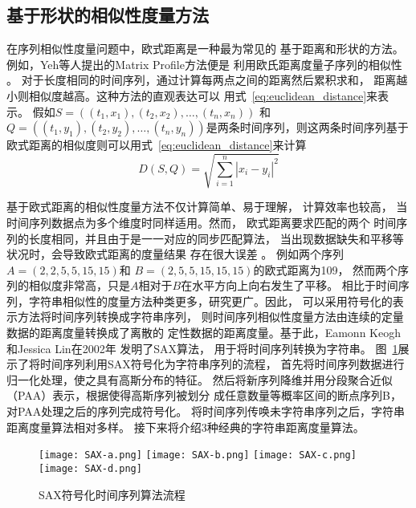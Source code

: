 \subsection{基于形状的相似性度量方法}
在序列相似性度量问题中，欧式距离是一种最为常见的
基于距离和形状的方法。
例如，Yeh等人提出的Matrix Profile方法便是
利用欧氏距离度量子序列的相似性
\cite{DBLP:conf/icdm/YehZUBDDSMK16}。
对于长度相同的时间序列，通过计算每两点之间的距离然后累积求和，
距离越小则相似度越高。这种方法的直观表达可以
用式~\ref{eq:euclidean_distance}来表示。
假如$S=\left(\left(t_1,x_1 \right),\left(t_2,x_2\right),\dots,\left(t_n,x_n\right)\right)$
和$Q=\left(\left(t_1,y_1 \right),\left(t_2,y_2\right),\dots,\left(t_n,y_n\right)\right)$是两条时间序列，则这两条时间序列基于欧式距离的相似度则可以用式~\ref{eq:euclidean_distance}来计算
\begin{equation}
  D\left(S,Q\right) = \sqrt{\sum_{i=1}^{n}{\left| x_{i}-y_{i} \right|^{2}}}
  \label{eq:euclidean_distance}
\end{equation}

基于欧式距离的相似性度量方法不仅计算简单、易于理解，
计算效率也较高，
当时间序列数据点为多个维度时同样适用。然而，
欧式距离要求匹配的两个
时间序列的长度相同，并且由于是一一对应的同步匹配算法，
当出现数据缺失和平移等状况时，会导致欧式距离的度量结果
存在很大误差
\cite{DBLP:journals/pvldb/DingTSWK08}。
例如两个序列$A=\left(2,2,5,5,15,15\right)$和
$B=\left(2,5,5,15,15,15\right)$的欧式距离为109，
然而两个序列的相似度非常高，只是$A$相对于$B$在水平方向上向右发生了平移。
相比于时间序列，字符串相似性的度量方法种类更多，研究更广。因此，
可以采用符号化的表示方法将时间序列转换成字符串序列，
则时间序列相似性度量方法由连续的定量数据的距离度量转换成了离散的
定性数据的距离度量。基于此，Eamonn Keogh和Jessica Lin在2002年
发明了SAX算法\cite{DBLP:conf/dmkd/LinKLC03}，
用于将时间序列转换为字符串。
图~\ref{fig:SAX}展示了将时间序列利用SAX符号化为字符串序列的流程，
首先将时间序列数据进行归一化处理，使之具有高斯分布的特征。
然后将新序列降维并用分段聚合近似（PAA）表示，根据使得高斯序列被划分
成任意数量等概率区间的断点序列B，对PAA处理之后的序列完成符号化。
将时间序列传唤未字符串序列之后，字符串距离度量算法相对多样。
接下来将介绍3种经典的字符串距离度量算法。
\begin{figure}
  \centering
    {\texttt{[image: SAX-a.png]}}
    {\texttt{[image: SAX-b.png]}}
    {\texttt{[image: SAX-c.png]}}
    {\texttt{[image: SAX-d.png]}}
  \caption{SAX符号化时间序列算法流程}
  \label{fig:SAX}
\end{figure}

